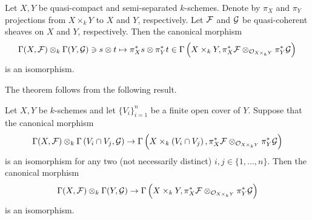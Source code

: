 \begin{theorem}\label{theorem:sections_of_qc_sheaves_on_products}
Let $X,Y$ be quasi-compact and semi-separated $k$-schemes. Denote by $\pi_X$ and $\pi_Y$ projections from $X\times_kY$ to $X$ and $Y$, respectively. Let ${\mathcal F}$ and ${\mathcal G}$ be quasi-coherent sheaves on $X$ and $Y$, respectively. Then the canonical morphism
$$\Gamma(X,{\mathcal F})\otimes_k\Gamma(Y,{\mathcal G})\ni s\otimes t \mapsto \pi_X^*s \otimes \pi_Y^{*}t \in \Gamma\left(X\times_kY,\pi_X^*{\mathcal F}\otimes_{{\mathcal O}_{X\times_kY}}\pi^*_Y{\mathcal G}\right)$$
is an isomorphism.
\end{theorem}
\noindent
The theorem follows from the following result.

\begin{lemma}\label{lemma:sections_and_open_covers_of_a_factor}
Let $X,Y$ be $k$-schemes and let $\{V_i\}_{i=1}^n$ be a finite open cover of $Y$. Suppose that the canonical morphism
$$\Gamma(X,{\mathcal F})\otimes_k\Gamma\left(V_i\cap V_j,{\mathcal G} \right) \rightarrow \Gamma\left( X \times_k \left(V_i\cap V_j\right),\pi_X^*{\mathcal F}\otimes_{{\mathcal O}_{X\times_kY}}\pi^*_Y{\mathcal G}\right)$$
is an isomorphism for any two (not necessarily distinct) $i,j\in \{1,...,n\}$. Then the canonical morphism
$$\Gamma(X,{\mathcal F})\otimes_k\Gamma(Y,{\mathcal G})\rightarrow \Gamma\left(X\times_kY,\pi_X^*{\mathcal F}\otimes_{{\mathcal O}_{X\times_kY}}\pi^*_Y{\mathcal G}\right)$$
is an isomorphism.
\end{lemma}
